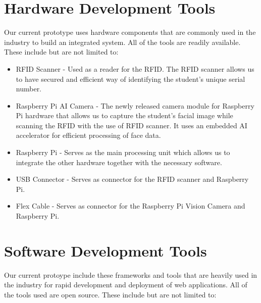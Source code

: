 \section{Hardware Development Tools}
Our current prototype uses hardware components that are commonly used in the industry to build an integrated system. All of the tools are readily available. These include but are not limited to:

\begin{itemize}
	\item	RFID Scanner - Used as a reader for the RFID. The RFID scanner allows us to have secured and efficient way of identifying the student's unique serial number.

\end{itemize}

\begin{itemize}
	\item	Raspberry Pi AI Camera - The newly released camera module for Raspberry Pi hardware that allows us to capture the student's facial image while scanning the RFID with the use of RFID scanner. It uses an embedded AI accelerator for efficient processing of face data.
	
\end{itemize} 

\begin{itemize}
	\item	Raspberry Pi - Serves as the main processing unit which allows us to integrate the other hardware together with the necessary software.
	
\end{itemize}

\begin{itemize}
	\item	USB Connector -  Serves as connector for the RFID scanner and Raspberry Pi.
	
\end{itemize}

\begin{itemize}
	\item	Flex Cable -  Serves as connector for the Raspberry Pi Vision Camera and Raspberry Pi. 
	
\end{itemize}
	
\section{Software Development Tools}
\label{sec:devtools}
 Our current protoype include these frameworks and tools that are heavily used in the industry for rapid development and deployment of web applications. All of the tools used are open source. These include but are not limited to:
 
